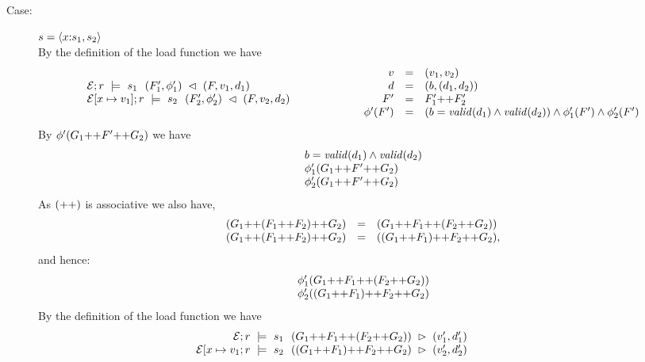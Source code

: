 {\begin{description}
\item[Case:] $s = \SPair{x}{s_1}{s_2}$\\[1ex]
%
By the definition of the load function we have
\[
\begin{array}{l}
\store{\Env}{F}{r}{v_1,d_1}{s_1}{F_1',\phi_1'}\\
\store{\Env[x \mapsto v_1]}{F}{r}{v_2,d_2}{s_2}{F_2',\phi_2'}\\
\end{array}\hspace*{2cm}\begin{array}{rcl}
v &=& (v_1,v_2)\\
d &=& (b,(d_1,d_2))\\
F' &=& F_1' \FAppend F_2'\\
\phi'(F') &=& (b = \valid{d_1} \wedge \valid{d_2}) \wedge \phi_1'(F') \wedge \phi_2'(F')\\
\end{array}
\]
By $\phi'(G_1 \FAppend F' \FAppend G_2)$ we have
\[
\begin{array}{l}
b = \valid{d_1} \wedge \valid{d_2}\\
\phi_1'(G_1 \FAppend F' \FAppend G_2)\\
\phi_2'(G_1 \FAppend F' \FAppend G_2)\\
\end{array}
\]
%
As $(\FAppend)$ is associative we also have,
\[
\begin{array}{rcl}
(G_1\FAppend (F_1\FAppend F_2)\FAppend G_2) &=& (G_1\FAppend F_1\FAppend (F_2\FAppend G_2))\\
(G_1\FAppend (F_1\FAppend F_2)\FAppend G_2) &=& ((G_1\FAppend F_1)\FAppend F_2\FAppend G_2),\\
\end{array}
\]
and hence:
\[
\begin{array}{l}
\phi_1'(G_1\FAppend F_1\FAppend (F_2\FAppend G_2))\\
\phi_2'((G_1\FAppend F_1)\FAppend F_2\FAppend G_2)\\
\end{array}
\]
By the definition of the load function we have 
\[ 
\begin{array}{rcll}
\load{\Env}{(G_1 \FAppend F_1 \FAppend (F_2 \FAppend G_2))}{r}{s_1}{v_1',d_1'}\\
\load{\Env[x \mapsto v_1}{((G_1 \FAppend F_1) \FAppend F_2 \FAppend G_2)}{r}{s_2}{v_2',d_2'}\\
\end{array}\hspace*{2cm}\begin{array}{rcl}

\end{array}\]
\end{description}}
